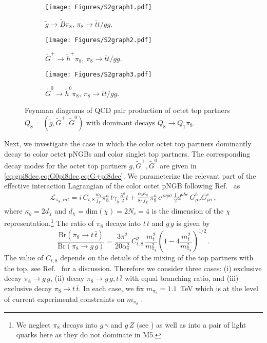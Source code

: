 \documentclass[preprintnumbers,nofootinbib,showpacs,eqsecnum,pre,12pt]{revtex4-1}
\begin{document}
\begin{figure}
	\centering
		\begin{subfigure}[]{0.31\linewidth}
		\centering
		\texttt{[image: Figures/S2graph1.pdf]} 
		\caption{$\tilde g\to \tilde B \pi_8$, $\pi_8\to \bar t t/g g$.}
		\end{subfigure}
				\begin{subfigure}[]{0.31\linewidth}
		\centering
		\texttt{[image: Figures/S2graph2.pdf]} 
		\caption{$\tilde G^+\to \tilde h^+ \pi_8$, $\pi_8\to \bar t t/g g$.}
		\end{subfigure}
				\begin{subfigure}[]{0.31\linewidth}
		\centering
		\texttt{[image: Figures/S2graph3.pdf]} 
		\caption{$\tilde G^0\to \tilde h^0\pi_8$, $\pi_8\to \bar t t/g g$.}
		\end{subfigure}
	\caption{Feynman diagrams of QCD pair production of octet top partners $Q_8=(\tilde g,\tilde G^+,\tilde G^0)$ with dominant decays  $Q_8\to Q_1\pi_8$.}	
	\label{fig:S2graphs}
\end{figure}




Next, we investigate the case in which the color octet top partners dominantly decay to color octet pNGBs and color singlet top partners. The corresponding decay modes for the octet top partners $\tilde g,\tilde G^+,\tilde G^0$ are given in \cref{eq:gpi8dec,eq:G0pi8dec,eq:G+pi8dec}.  
We parameterize the relevant part of the effective interaction Lagrangian of the color octet pNGB following Ref.~\cite{Belyaev:2016ftv} as
\begin{align}
	\mathcal L_{\pi_8,int} = i \,C_{t,8} \frac{m_t}{f_\chi} \pi_8^a\, \overline t \gamma_5 \frac{\lambda^a}{2} t + \frac{\alpha_s \kappa_g}{8\pi f_\chi}\, \pi_8^a \, \epsilon^{\mu\nu\rho\sigma}\, \frac 12 d^{abc}\, G^b_{\mu\nu} G^c_{\rho\sigma} \,,
\end{align}
where $\kappa_g=2d_\chi$ and $d_\chi= \mathrm{dim}(\chi)=2N_c =4$ is the dimension of the $\chi$ representation.\footnote{We neglect  $\pi_8$ decays into $g\,\gamma$ and
$g\, Z$ (see \cite{Cacciapaglia:2020vyf}) as well as into a pair of light quarks here as they do not dominate in M5.} 
%
The ratio of $\pi_8$ decays into $t\,\bar t$ and $g\,g$ is given by
\begin{equation}
	\frac{\mathrm{Br}(\pi_8\to t\,\bar t)}{\mathrm{Br}(\pi_8\to g\,g)} = \frac{3\pi^2}{20\alpha_s^2} \, C_{t,8}^2 \, \frac{m_t^2}{m^2_{\pi_8}} \left( 1-4\frac{m_t^2 }{m_{\pi_8}^2} \right)^{1/2} \,.
\end{equation}
The value of $C_{t,8}$ depends on the details of the mixing of the top partners with the top, see Ref.~\cite{Cacciapaglia:2020vyf} for a discussion. Therefore we consider three cases:
(i) exclusive decay $\pi_8\to g\, g$, (ii)  decay  $\pi_8\to g\,g, t\, \bar t$ with equal branching ratio, and (iii) exclusive decay $\pi_8\to t\,\bar t$.
In each case, we fix $m_{\pi_8}=1.1$~TeV which is at the level of current experimental constraints on $m_{\pi_8}$ \cite{Cacciapaglia:2020vyf}.
\end{document}
